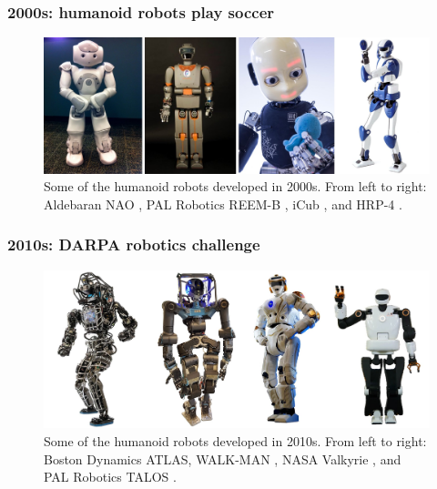 \subsubsection{2000s: humanoid robots play soccer}
\begin{figure}
    \centering
    \includegraphics[width=\textwidth]{figures/01-introduction/robots-in-2000.jpg}
    \caption{Some of the humanoid robots developed in 2000s. From left to right:
        Aldebaran NAO \cite{Gouaillier2008NAOHumanoid},
        PAL Robotics REEM-B \cite{Tellez2008REEMB},
        iCub \cite{Metta2010iCubHumanoid}, and
        HRP-4 \cite{Kaneko2011HRP4}.
    }
    \label{fig:introduction:robots-in-2000}
\end{figure}

\subsubsection{2010s: DARPA robotics challenge}
\begin{figure}
    \centering
    \includegraphics[width=\textwidth]{figures/01-introduction/robots-in-2010.jpg}
    \caption{Some of the humanoid robots developed in 2010s. From left to right:
        Boston Dynamics ATLAS,
        WALK-MAN \cite{Tsagarakis2017WALKMAN},
        NASA Valkyrie \cite{Radford2015Valkyrie}, and
        PAL Robotics TALOS \cite{Stasse2017TALOS}.}
    \label{fig:introduction:robots-in-2010}
\end{figure}

